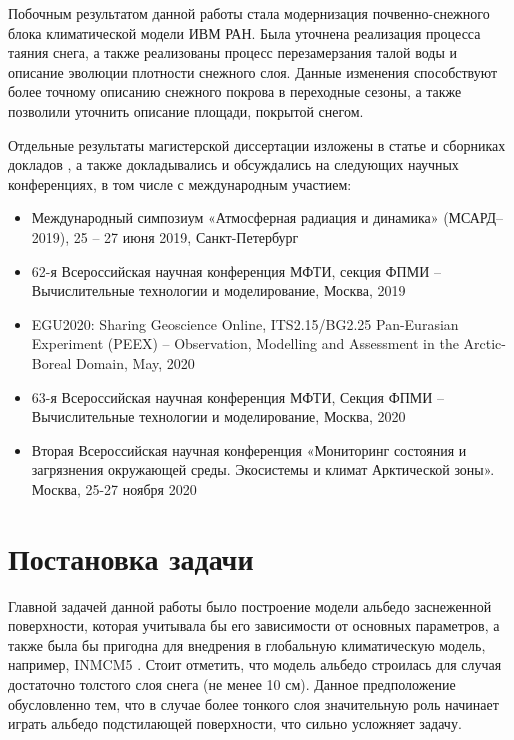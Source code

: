 \documentclass[a4paper, fontsize=14pt]{scrartcl}
\begin{document}
Побочным результатом данной работы стала модернизация почвенно-снежного блока климатической модели ИВМ РАН. Была уточнена реализация процесса таяния снега, а также реализованы процесс перезамерзания талой воды и описание эволюции плотности снежного слоя. Данные изменения способствуют более точному описанию снежного покрова в переходные сезоны, а также позволили уточнить описание площади, покрытой снегом.

Отдельные результаты магистерской диссертации изложены в статье \cite{Chernenkov2021rus} и сборниках докладов \cite{MSARD2019, mipt2019, EGU2020poster, EGU2020, mipt2020, Arctic2020}, а также докладывались и обсуждались на следующих научных конференциях, в том числе с международным участием:
\begin{itemize}
    \item Международный симпозиум «Атмосферная радиация и динамика» (МСАРД–2019), 25 – 27 июня 2019, Санкт-Петербург \cite{MSARD2019}
    \item 62-я Всероссийская научная конференция МФТИ, секция ФПМИ – Вычислительные технологии и моделирование, Москва, 2019 \cite{mipt2019}
    \item EGU2020: Sharing Geoscience Online, ITS2.15/BG2.25 Pan-Eurasian Experiment (PEEX) – Observation, Modelling and Assessment in the Arctic-Boreal Domain, May, 2020 \cite{EGU2020poster, EGU2020} \sloppy 
    \item 63-я Всероссийская научная конференция МФТИ, Секция ФПМИ – Вычислительные технологии и моделирование, Москва, 2020 \cite{mipt2020}
    \item Вторая Всероссийская научная конференция «Мониторинг состояния и загрязнения окружающей среды. Экосистемы и климат Арктической зоны». Москва, 25-27 ноября 2020 \cite{Arctic2020}
\end{itemize} 



\newpage
\section{Постановка задачи}

Главной задачей данной работы было построение модели альбедо заснеженной поверхности, которая учитывала бы его зависимости от основных параметров, а также была бы пригодна для внедрения в глобальную климатическую модель, например, INMCM5 \cite{Volodin2017}. Стоит отметить, что модель альбедо строилась для случая достаточно толстого слоя снега (не менее 10 см). Данное предположение обусловленно тем, что в случае более тонкого слоя значительную роль начинает играть альбедо подстилающей поверхности, что сильно усложняет задачу. 
\end{document}
